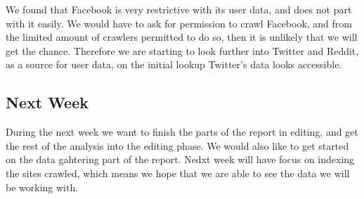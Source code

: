 We found that Facebook is very restrictive with its user data, and does not part
with it easily. We would have to ask for permission to crawl Facebook, and from
the limited amount of crawlers permitted to do so, then it is unlikely that we
will get the chance. Therefore we are starting to look further into Twitter and
Reddit, as a source for user data, on the initial lookup Twitter's data looks
accessible.

\subsection*{Next Week}
During the next week we want to finish the parts of the report in editing, and
get the rest of the analysis into the editing phase. We would also like to get
started on the data gahtering part of the report. Nedxt week will have focus on
indexing the sites crawled, which means we hope that we are able to see the data
we will be working with.







